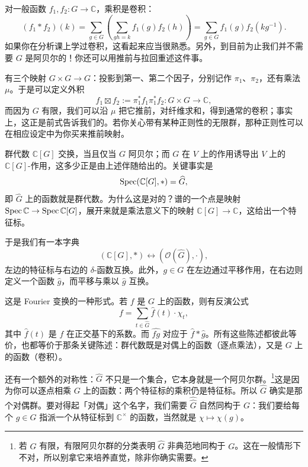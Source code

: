 对一般函数 $f_1,f_2:G\to\mathbb{C}$，乘积是卷积：
\[
(f_1*f_2)(k)=\sum_{g\in G}\left(\sum_{gh=k}f_1(g)f_2(h)\right)=\sum_{g\in G}f_1(g)f_2(kg^{-1}).
\]
如果你在分析课上学过卷积，这看起来应当很熟悉。另外，到目前为止我们并不需要 $G$ 是阿贝尔的！你还可以用推前与拉回重述这件事。

有三个映射 $G\times G\to G$：投影到第一、第二个因子，分别记作 $\pi_1$、$\pi_2$，还有乘法 $\mu$。于是可以定义外积
\[
f_1\boxtimes f_2:=\pi_1^*f_1\pi_1^*f_2:G\times G\longrightarrow\mathbb{C},
\]
而因为 $G$ 有限，我们可以沿 $\mu$ 把它推前，对纤维求和，得到通常的卷积；事实上，这正是前式告诉我们的。若你关心带有某种正则性的无限群，那种正则性可以在相应设定中为你买来推前映射。

群代数 $\mathbb{C}[G]$ 交换，当且仅当 $G$ 阿贝尔；而 $G$ 在 $V$ 上的作用诱导出 $V$ 上的 $\mathbb{C}[G]$-作用，这多少正是由上述伴随给出的。关键事实是
\[
\operatorname{Spec}(\mathbb{C}[G],*)=\widehat{G},
\]
即 $\widehat{G}$ 上的函数就是群代数。为什么这是对的？谱的一个点是映射 $\operatorname{Spec}\mathbb{C}\to\operatorname{Spec}\mathbb{C}[G]$，展开来就是乘法意义下的映射 $\mathbb{C}[G]\to\mathbb{C}$，这给出一个特征标。

于是我们有一本字典
\[
(\mathbb{C}[G],*)\longleftrightarrow(\mathcal{O}(\widehat{G}),\cdot),
\]
左边的特征标与右边的 $\delta$-函数互换。此外，$g\in G$ 在左边通过平移作用，在右边则定义一个函数 $\widehat{g}$，而平移与乘以 $\widehat{g}$ 互换。

这是 Fourier 变换的一种形式。若 $f$ 是 $G$ 上的函数，则有反演公式
\[
f=\sum_{t\in\widehat{G}}\widehat{f}(t)\cdot\chi_t,
\]
其中 $\widehat{f}(t)$ 是 $f$ 在正交基下的系数。而 $\widehat{fg}$ 对应于 $\widehat{f}*\widehat{g}$。所有这些陈述都彼此等价，也都等价于那条关键陈述：群代数既是对偶上的函数（逐点乘法），又是 $G$ 上的函数（卷积）。

还有一个额外的对称性：$\widehat{G}$ 不只是一个集合，它本身就是一个阿贝尔群。\footnote{若 $G$ 有限，有限阿贝尔群的分类表明 $\widehat{G}$ 非典范地同构于 $G$。这在一般情形下不对，所以别拿它来培养直觉，除非你确实需要。}这是因为你可以逐点相乘 $G$ 上的函数：两个特征标的乘积仍是特征标。所以 $\widehat{G}$ 确实是那个对偶群。要对得起「对偶」这个名字，我们需要 $\widehat{\widehat{G}}$ 自然同构于 $G$：我们要给每个 $g\in G$ 指派一个从特征标到 $\mathbb{C}^\times$ 的函数，当然就是 $\chi\mapsto\chi(g)$。

